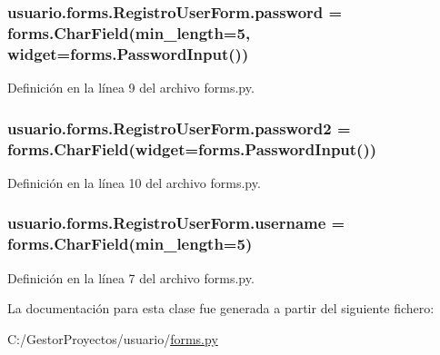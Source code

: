 \subsubsection[{\texorpdfstring{password}{password}}]{\setlength{\rightskip}{0pt plus 5cm}usuario.\+forms.\+Registro\+User\+Form.\+password = forms.\+Char\+Field(min\+\_\+length=5, widget=forms.\+Password\+Input())\hspace{0.3cm}{\ttfamily [static]}}\hypertarget{classusuario_1_1forms_1_1_registro_user_form_aae8a355143f32fae719b573908b9edd0}{}\label{classusuario_1_1forms_1_1_registro_user_form_aae8a355143f32fae719b573908b9edd0}


Definición en la línea 9 del archivo forms.\+py.

\subsubsection[{\texorpdfstring{password2}{password2}}]{\setlength{\rightskip}{0pt plus 5cm}usuario.\+forms.\+Registro\+User\+Form.\+password2 = forms.\+Char\+Field(widget=forms.\+Password\+Input())\hspace{0.3cm}{\ttfamily [static]}}\hypertarget{classusuario_1_1forms_1_1_registro_user_form_acbad77fd91e846f569ddfe7cf664afc2}{}\label{classusuario_1_1forms_1_1_registro_user_form_acbad77fd91e846f569ddfe7cf664afc2}


Definición en la línea 10 del archivo forms.\+py.

\subsubsection[{\texorpdfstring{username}{username}}]{\setlength{\rightskip}{0pt plus 5cm}usuario.\+forms.\+Registro\+User\+Form.\+username = forms.\+Char\+Field(min\+\_\+length=5)\hspace{0.3cm}{\ttfamily [static]}}\hypertarget{classusuario_1_1forms_1_1_registro_user_form_aa7a52509d98f74c030597cb5edfec969}{}\label{classusuario_1_1forms_1_1_registro_user_form_aa7a52509d98f74c030597cb5edfec969}


Definición en la línea 7 del archivo forms.\+py.



La documentación para esta clase fue generada a partir del siguiente fichero\+:\begin{DoxyCompactItemize}
\item 
C\+:/\+Gestor\+Proyectos/usuario/\hyperlink{usuario_2forms_8py}{forms.\+py}\end{DoxyCompactItemize}
